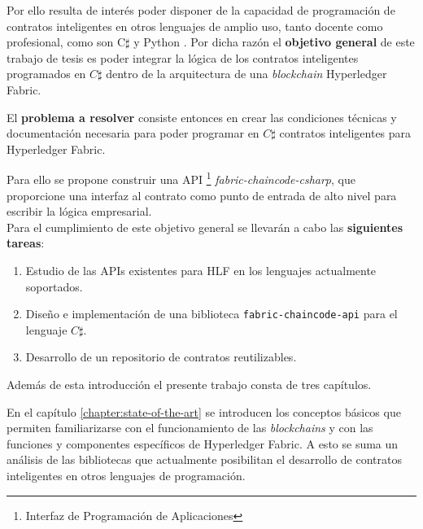 
Por ello resulta de interés poder disponer de la capacidad de programación de contratos inteligentes en otros lenguajes de amplio uso, tanto docente como profesional, como son C$\sharp$ y Python . Por dicha razón el \textbf{objetivo general} de este trabajo de tesis es poder integrar la lógica de los contratos inteligentes programados en $C\sharp$ dentro de la arquitectura de una \textit{blockchain} Hyperledger Fabric.


El \textbf{problema a resolver} consiste entonces en crear las condiciones técnicas y documentación necesaria para poder programar en $ C\sharp $ contratos inteligentes para Hyperledger Fabric.

Para ello se propone construir una API \footnote{Interfaz de Programación de Aplicaciones} \textit{fabric-chaincode-csharp},  que proporcione una interfaz al contrato como punto de entrada de alto nivel para escribir la lógica empresarial.\\

Para el cumplimiento de este objetivo general se llevarán a cabo las \textbf{siguientes tareas}:

\begin{enumerate}
\item Estudio de las APIs existentes para HLF en  los lenguajes actualmente soportados.
\item Diseño e implementación de una biblioteca \texttt{fabric-chaincode-api} para el lenguaje $ C\sharp $.
\item Desarrollo de un repositorio de contratos reutilizables.
\end{enumerate}

Además de esta introducción el presente trabajo consta de tres capítulos.

En el capítulo \ref{chapter:state-of-the-art} se introducen los conceptos básicos que permiten familiarizarse con el funcionamiento de las \textit{blockchains} y con las funciones y componentes específicos de Hyperledger Fabric. A esto se suma un análisis de las bibliotecas que  actualmente posibilitan el desarrollo de contratos inteligentes en otros lenguajes de programación.

